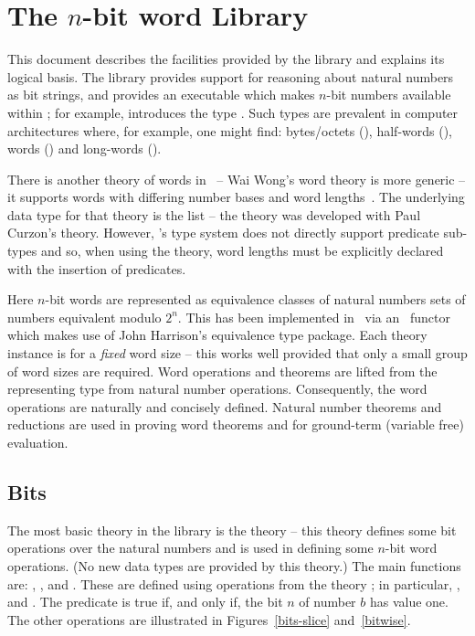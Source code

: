 \chapter{The $n$-bit word Library}

\newcommand\ptt{\tt}

This document describes the facilities provided by the  library and
explains its logical basis.
The library provides support for reasoning about natural numbers as bit strings, and provides an executable  which makes $n$-bit numbers available within \HOL; for example,  introduces the type .
Such types are prevalent in computer architectures where, for example, one might find: bytes/octets (), half-words (), words () and long-words ().

There is another theory of words in \HOL\ --  Wai Wong's word theory is more generic -- it supports words with differing number bases and word lengths~\cite{wong}.
The underlying data type for that theory is the list -- the theory was developed with Paul Curzon's  theory.
However, \HOL's type system does not directly support predicate sub-types and so, when using the theory, word lengths must be explicitly declared with the insertion of predicates.

Here $n$-bit words are represented as equivalence classes of natural numbers \ie{} sets of numbers equivalent modulo $2^n$.
This has been implemented in \HOL\ via an \ML\ functor which makes use of John Harrison's equivalence type package.
Each theory instance is for a \emph{fixed} word size -- this works well provided that only a small group of word sizes are required.
Word operations and theorems are lifted from the representing type \ie{} from natural number operations.
Consequently, the word operations are naturally and concisely defined.
Natural number theorems and reductions are used in proving word theorems and for ground-term (variable free) evaluation.

\section{Bits} \label{bits}

The most basic theory in the library is the theory  -- this theory defines some bit operations over the natural numbers and is used in defining some $n$-bit word operations.  (No new data types are provided by this theory.)
The main functions are: , ,  and .  These are defined using operations from the theory ; in particular, ,  and .
The predicate  is true if, and only if, the bit $n$ of number $b$ has value one.
The other operations are illustrated in Figures~\ref{bits-slice} and~\ref{bitwise}.
%
%
%
%

